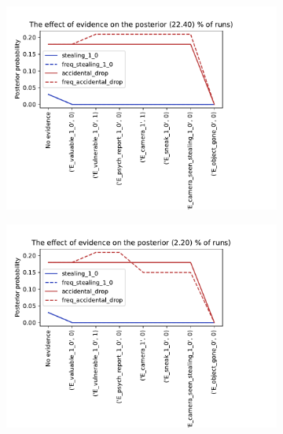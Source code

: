 \begin{enumerate}
\begin{figure}[htbp]
\begin{center}
\begin{subfigure}{.66\textwidth}
\caption{}
\label{default}
\end{subfigure}
\begin{subfigure}{.66\textwidth}
\includegraphics[width=\linewidth]{../experiments/GroteMarkt/plots/evidence_progress_GroteMarkt_3.pdf}
\caption{}
\label{default}
\end{subfigure}%
\begin{subfigure}{.66\textwidth}
\includegraphics[width=\linewidth]{../experiments/GroteMarkt/plots/evidence_progress_GroteMarkt_4.pdf}
\caption{}
\label{default}
\end{subfigure}
\begin{subfigure}{.66\textwidth}

\end{subfigure}
\end{center}
\end{figure}
\end{enumerate}
